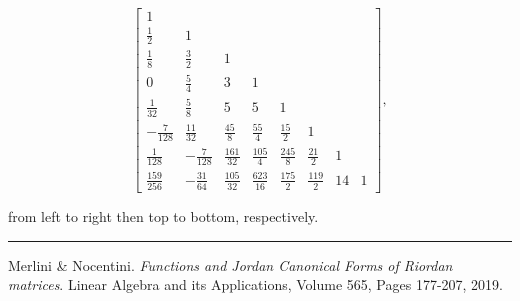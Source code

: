 \documentclass[9pt]{beamer}
\begin{document}
\begin{frame}[fragile]
\begin{displaymath}
       \left[\begin{matrix}1 &  &  &  &  &  &  & \\\frac{1}{2} & 1 &  &  &  &  &  & \\\frac{1}{8} & \frac{3}{2} & 1 &  &  &  &  & \\0 & \frac{5}{4} & 3 & 1 &  &  &  & \\\frac{1}{32} & \frac{5}{8} & 5 & 5 & 1 &  &  & \\- \frac{7}{128} & \frac{11}{32} & \frac{45}{8} & \frac{55}{4} & \frac{15}{2} & 1 &  & \\\frac{1}{128} & - \frac{7}{128} & \frac{161}{32} & \frac{105}{4} & \frac{245}{8} & \frac{21}{2} & 1 & \\\frac{159}{256} & - \frac{31}{64} & \frac{105}{32} & \frac{623}{16} & \frac{175}{2} & \frac{119}{2} & 14 & 1\end{matrix}\right],
    \end{displaymath}

    from left to right then top to bottom, respectively.

\vfill
\noindent\rule{\textwidth}{0.1pt}
{\footnotesize
Merlini \& Nocentini. \textit{Functions and Jordan Canonical Forms of Riordan
matrices}. \newline Linear Algebra and its Applications, Volume 565, Pages 177-207, 2019.}
\end{frame}
\end{document}
